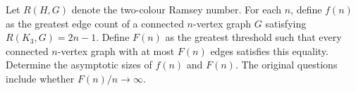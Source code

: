 Let $R(H,G)$ denote the two-colour Ramsey number. For each $n$, define $f(n)$ as the greatest edge count of a connected $n$-vertex graph $G$ satisfying $R(K_3,G)=2n-1$. Define $F(n)$ as the greatest threshold such that every connected $n$-vertex graph with at most $F(n)$ edges satisfies this equality. Determine the asymptotic sizes of $f(n)$ and $F(n)$. The original questions include whether $F(n)/n\to\infty$.
